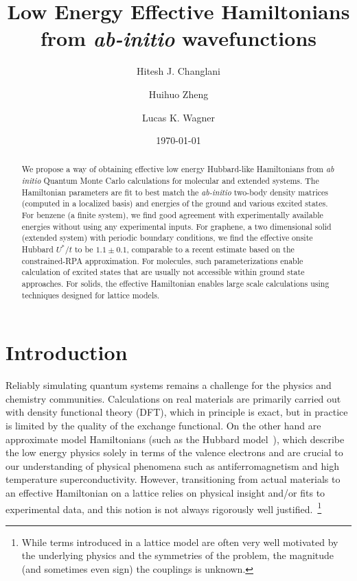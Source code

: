 \documentclass[aip,jcp,twocolumn,10pt]{revtex4-1}
\begin{document}
\renewcommand\abstractname{}

\title{Low Energy Effective Hamiltonians from \emph{ab-initio} wavefunctions}
\author{Hitesh J. Changlani}
\author{Huihuo Zheng}
\author{Lucas K. Wagner}
\date{\today}

\begin{abstract}
We propose a way of obtaining effective low energy Hubbard-like Hamiltonians from \emph{ab initio} 
Quantum Monte Carlo calculations for molecular and extended systems. 
The Hamiltonian parameters are fit to best match the \emph{ab-initio} 
two-body density matrices (computed in a localized basis) 
and energies of the ground and various excited states. 
For benzene (a finite system), we find 
good agreement with experimentally available energies 
without using any experimental inputs. 
For graphene, a two dimensional solid (extended system) 
with periodic boundary conditions, we find the effective onsite 
Hubbard $U^{*}/t$ to be $1.1 \pm 0.1$, comparable to 
a recent estimate based on the constrained-RPA approximation. For molecules, such 
parameterizations enable calculation of excited states that are usually not 
accessible within ground state approaches. For solids, the effective 
Hamiltonian enables large scale calculations using techniques 
designed for lattice models.  
\end{abstract}

\maketitle
\section{Introduction}
\label{sec:introduction}
Reliably simulating quantum systems remains a challenge 
for the physics and chemistry communities. Calculations on real materials 
are primarily carried out with density functional theory (DFT), 
which in principle is exact, but in practice is limited by the quality of the exchange functional. 
On the other hand are approximate model Hamiltonians (such as the Hubbard model~\cite{Hubbard}), 
which describe the low energy physics solely in terms of the valence electrons and 
are crucial to our understanding of physical phenomena such 
as antiferromagnetism and high temperature superconductivity. 
However, transitioning from actual materials to an effective Hamiltonian on a lattice relies 
on physical insight and/or fits to experimental data, and this notion is not always rigorously well justified.~\footnote{
While terms introduced in a lattice model are often very well motivated by the 
underlying physics and the symmetries of the problem, 
the magnitude (and sometimes even sign) the couplings is unknown.}
 
\end{document}
